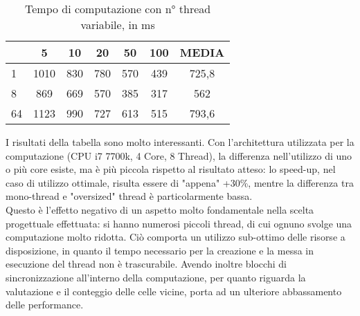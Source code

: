 \documentclass[12pt,a4paper,openright,oneside]{report}
\begin{document}
\begin{table}[h]
	\begin{tabular}{|l|ccccc|c|}
		\hline
		\diagbox{Thread}{Generazioni} & 5 & 10 & 20 & 50 & 100 & MEDIA\\
		\hline
		1 & 1010 & 830 & 780 & 570 & 439 & 725,8\\
		8 & 869 & 669 & 570 & 385 & 317 & 562\\
		64 & 1123 & 990 & 727 & 613 & 515 & 793,6\\
		\hline
	\end{tabular}
	\caption{Tempo di computazione con n° thread variabile, in ms}
\end{table}

I risultati della tabella sono molto interessanti. Con l'architettura utilizzata per la computazione (CPU i7 7700k, 4 Core, 8 Thread),
la differenza nell'utilizzo di uno o più core esiste, ma è più piccola rispetto al risultato atteso: lo speed-up, nel caso di utilizzo
ottimale, risulta essere di "appena" +30\%, mentre la differenza tra mono-thread e "oversized" thread è particolarmente bassa.\\

Questo è l'effetto negativo di un aspetto molto fondamentale nella scelta progettuale effettuata: si hanno numerosi piccoli thread, di cui
ognuno svolge una computazione molto ridotta. Ciò comporta un utilizzo sub-ottimo delle risorse a disposizione, in quanto il tempo
necessario per la creazione e la messa in esecuzione del thread non è trascurabile. Avendo inoltre blocchi di sincronizzazione all'interno
della computazione, per quanto riguarda la valutazione e il conteggio delle celle vicine, porta ad un ulteriore abbassamento delle
performance.

\lhead[\fancyplain{}{\bfseries\thepage}]{\fancyplain{}{\bfseries\rightmark}}
\end{document}
